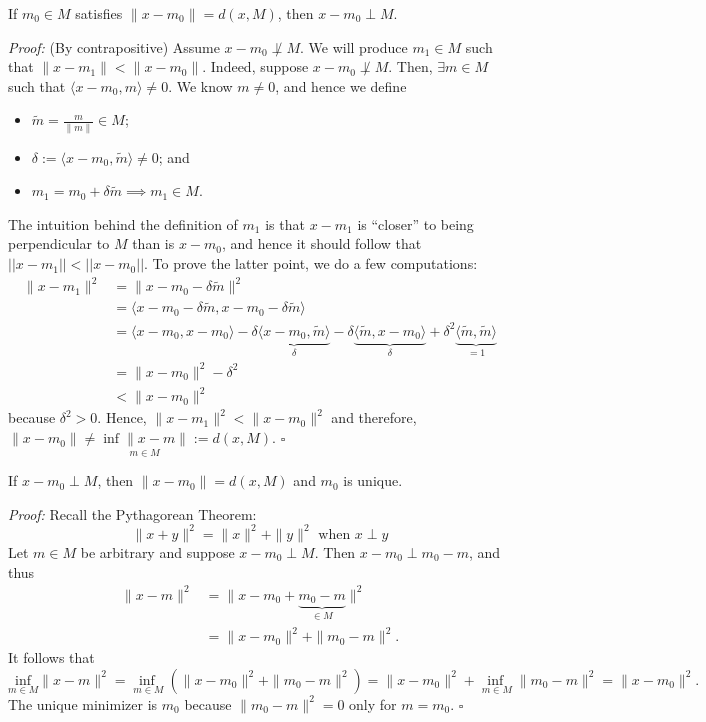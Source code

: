 \begin{claim}
If $m_0 \in M$ satisfies $\|x-m_0\| = d(x,M)$, then $x-m_0 \perp M$. 
\end{claim}
    \emph{Proof:} (By contrapositive) Assume $x-m_0 \not\perp M$. We will produce $m_1 \in M$ such that $\|x-m_1\| <  \|x-m_0\|$. Indeed, suppose $x-m_0 \not\perp M$. Then, $\exists m \in M$ such that $ \langle x-m_0, m \rangle  \neq 0$. We know $m \neq 0$, and hence we define 
    \begin{itemize}
        \item $\tilde{m} = \frac{m}{\|m\|} \in M$; 
        \item $\delta := \langle x-m_0, \tilde{m} \rangle  \neq 0$; and
        \item $m_1 = m_0 + \delta \tilde{m} \implies m_1 \in M$.
    \end{itemize}
The intuition behind the definition of $m_1$ is that $x-m_1$ is ``closer'' to being perpendicular to $M$ than is $x - m_0$, and hence it should follow that $||x - m_1|| < ||x-m_0||$.  To prove the latter point, we do a few computations:
        \begin{align*}
            \|x-m_1\|^2 &= \|x-m_0-\delta \tilde{m}\|^2 \\
            &=  \langle x-m_0-\delta \tilde{m}, x-m_0-\delta \tilde{m} \rangle  \\
            &=  \langle x-m_0,x-m_0 \rangle  -\delta \underbrace{\langle x-m_0,\tilde{m} \rangle}_\delta -\delta \underbrace{\langle \tilde{m},x-m_0 \rangle}_\delta  +\delta^2 \underbrace{\langle \tilde{m},\tilde{m} \rangle}_{=1}  \\
            &= \|x-m_0\|^2 -\delta^2 \\
            &< \|x-m_0\|^2
        \end{align*}
    because $\delta^2 >0$.  Hence, $\|x-m_1\|^2 <  \|x-m_0\|^2$ and therefore, $\|x-m_0\| \neq \underset{m \in M}{\inf  \|x-m\|}:= d(x,M)$.  \hfill   $\square$ 
   
 

\begin{claim}
 If $x-m_0 \perp M$, then $\|x-m_0\| = d(x,M)$ and $m_0$ is unique. 
\end{claim}
\emph{Proof:} Recall the Pythagorean Theorem:
    \begin{equation*}
        \|x+y\|^2=\|x\|^2+\|y\|^2 \mbox{ when } x \perp y
    \end{equation*}
    Let $m \in M$ be arbitrary and suppose $x-m_0 \perp M$. Then  $x-m_0 \perp  m_0-m$, and thus
    \begin{align*}
        \|x-m\|^2 &= \|x-m_0+\underbrace{m_0-m}_{\in M}\|^2 \\
        &= \|x-m_0\|^2 + \|m_0 - m\|^2.
    \end{align*}
    It follows that
    $$\underset{m \in M}{\text{inf}} \|x-m\|^2=\underset{m \in M}{\inf~ }\left( \|x-m_0\|^2 + \|m_0 - m\|^2 \right) = 
     \|x-m_0\|^2 + \underset{m \in M}{\inf~ } \|m_0 - m\|^2 =\|x-m_0\|^2. $$ 
The unique minimizer is $m_0$ because $ \|m_0 - m\|^2 =0$  only for $m=m_0$. \hfill $\square$ \\

